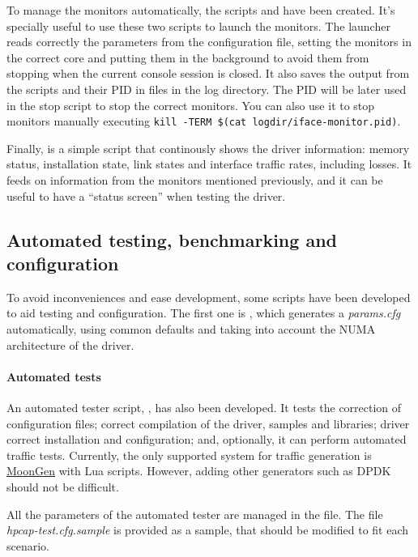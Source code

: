 \documentclass[oneside]{hpman}
\begin{document}
To manage the monitors automatically, the scripts  and  have been created. It's specially useful to use these two scripts to launch the monitors. The launcher reads correctly the parameters from the configuration file, setting the monitors in the correct core and putting them in the background to avoid them from stopping when the current console session is closed. It also saves the output from the scripts and their PID in files in the log directory. The PID will be later used in the stop script to stop the correct monitors. You can also use it to stop monitors manually executing \texttt{kill -TERM \$(cat logdir/iface-monitor.pid)}.

Finally,  is a simple script that continously shows the driver information: memory status, installation state, link states and interface traffic rates, including losses. It feeds on information from the monitors mentioned previously, and it can be useful to have a ``status screen'' when testing the driver.

\subsection{Automated testing, benchmarking and configuration}

To avoid inconveniences and ease development, some scripts have been developed to aid testing and configuration. The first one is , which generates a \textit{params.cfg} automatically, using common defaults and taking into account the NUMA architecture of the driver.

\paragraph{Automated tests} An automated tester script, , has also been developed. It tests the correction of configuration files; correct compilation of the driver, samples and libraries; driver correct installation and configuration; and, optionally, it can perform automated traffic tests. Currently, the only supported system for traffic generation is \href{https://github.com/emmericp/MoonGen}{MoonGen} with Lua scripts. However, adding other generators such as DPDK should not be difficult.

All the parameters of the automated tester are managed in the  file. The file \textit{hpcap-test.cfg.sample} is provided as a sample, that should be modified to fit each scenario.
\end{document}
